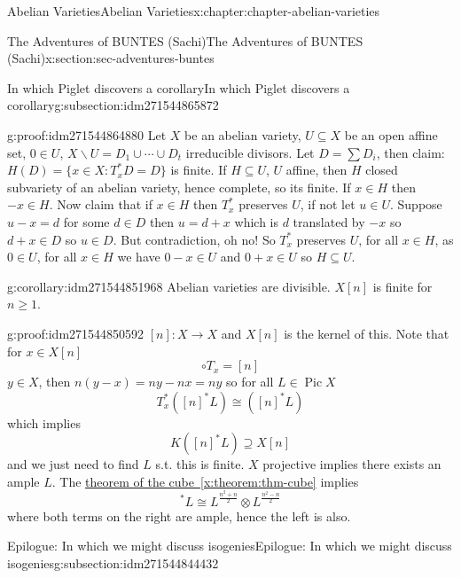 \documentclass[oneside,10pt,]{book}
\numberwithin{equation}{section}
\DeclareMathOperator{\Pic}{Pic}
\begin{document}
\begin{chapterptx}{Abelian Varieties}{}{Abelian Varieties}{}{}{x:chapter:chapter-abelian-varieties}
\begin{sectionptx}{The Adventures of BUNTES (Sachi)}{}{The Adventures of BUNTES (Sachi)}{}{}{x:section:sec-adventures-buntes}
\begin{subsectionptx}{In which Piglet discovers a corollary}{}{In which Piglet discovers a corollary}{}{}{g:subsection:idm271544865872}
\begin{proofptx}{}{g:proof:idm271544864880}
Let \(X\) be an abelian variety, \(U \subseteq X\) be an open affine set, \(0\in U\), \(X\smallsetminus U = D_1 \cup \cdots \cup D_t\) irreducible divisors. Let \(D = \sum D_i\), then claim: \(H(D) = \{x\in X: T_x^*D  = D \}\) is finite. If \(H\subseteq U\), \(U\) affine, then \(H\) closed subvariety of an abelian variety, hence complete, so its finite. If \(x\in H\) then \(-x \in H\). Now claim that if \(x\in H\) then \(T_x^*\) preserves \(U\), if not let \(u\in U\). Suppose \(u-x = d\) for some \(d\in D\) then \(u = d+x\) which is \(d\) translated by \(-x\) so \(d+x \in D\) so \(u\in D\). But contradiction, oh no! So \(T_x^*\) preserves \(U\), for all \(x\in H\), as \(0 \in U\), for all \(x\in H\) we have \(0-x \in U\) and  \(0+x\in U\) so \(H\subseteq U\).%
\end{proofptx}
\begin{corollary}{}{}{g:corollary:idm271544851968}%
Abelian varieties are divisible. \(X[n]\) is finite for \(n\ge 1\).%
\end{corollary}
\begin{proofptx}{}{g:proof:idm271544850592}
\([n]\colon X \to X\) and \(X[n]\) is the kernel of this. Note that for \(x\in X[n]\)%
\begin{equation*}
[n]\circ T_x = [n]
\end{equation*}
\(y\in X\), then \(n(y-x) = ny - nx = ny\) so for all \(L \in \Pic X\)%
\begin{equation*}
T_x^*([n]^* L ) \cong ([n]^* L)
\end{equation*}
which implies%
\begin{equation*}
K([n]^* L ) \supseteq X[n]
\end{equation*}
and we just need to find \(L\) s.t. this is finite. \(X\) projective implies there exists an ample \(L\). The \hyperref[x:theorem:thm-cube]{theorem of the cube~\ref{x:theorem:thm-cube}} implies%
\begin{equation*}
[n]^*L \cong L^{\frac{n^2 + n}{2}} \otimes L^{\frac{n^2 - n}{2}}
\end{equation*}
where both terms on the right are ample, hence the left is also.%
\end{proofptx}
\end{subsectionptx}
%
%
\typeout{************************************************}
\typeout{************************************************}
%
\begin{subsectionptx}{Epilogue: In which we might discuss isogenies}{}{Epilogue: In which we might discuss isogenies}{}{}{g:subsection:idm271544844432}

\end{subsectionptx}
\end{sectionptx}
\end{chapterptx}
\end{document}
